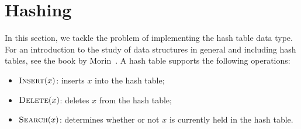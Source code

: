 \begin{comment}
  If the space of choices for each pivot were unrestricted, this
  decision space would have size
  $n {n - 1 \choose \ell} \ell! (n - \ell - 1)! = n!$. Since half of
  the values in any given range are unbalanced, then each node along
  $x$ decreases the size of the decision space by a factor of $2$. So,
  by \lemref{incremental-code}, the total code has length at most
  \begin{align*}
    b & \leq 2t H(n_1(yz)/2t) + \log (n!/2^t) + O(\log t) \\
      & \leq 2c \log n H\left(\frac{1 + 1/\log (4/3)}{2c}\right) + \log n! - t + O(\log \log n) \\
      & \leq \log n! - c \log n\left(1 - 2 H\left(\frac{1 + 1/\log (4/3)}{2c}\right)\right) + O(\log \log n).
  \end{align*}
  For sufficiently large $c$, applying \lemref{uel}, we obtain that
  $\text{BST}(\sigma)$ has height $O(\log n)$ with probability
  $1 - O(1/n)$.
\end{proof}

\begin{rem}
  Devroye~\cite{devroye:records} shows how the length of the path to
  the key $i$ in $\text{BST}(\sigma)$ relates to the number of records
  in $\sigma$. In particular, the number of nodes along the rightmost
  path in $\text{BST}(\sigma)$ is the number of records in
  $\sigma$. Since the height of a tree is the length of its longest
  root-to-leaf path, then \thmref{bst-height} implies that the number
  of records in a uniformly random permutation is also $O(\log n)$
  with high probability.
\end{rem}
\end{comment}

\section{Hashing}

In this section, we tackle the problem of implementing the hash table
data type. For an introduction to the study of data structures in
general and including hash tables, see the book by
Morin~\cite{morin:open}. A hash table supports the following
operations:
\begin{itemize}
\item $\textsc{Insert}(x)$: inserts $x$ into the hash table;
\item $\textsc{Delete}(x)$: deletes $x$ from the hash table;
\item $\textsc{Search}(x)$: determines whether or not $x$ is currently
  held in the hash table.
\end{itemize}


